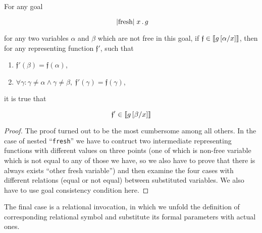 {\color{blue}
\begin{lemma}
\label{ChangeFreeVarLemma}
For any goal 

\[
\mbox{\lstinline|fresh|}\;x\,.\,g
\]

for any two variables $\alpha$ and $\beta$ which are not free in this goal,
if $\mathfrak{f} \in \llbracket{g\,[\alpha/x]}\rrbracket$, then for any representing function $\mathfrak{f}'$, such that

\begin{enumerate}
\item $\mathfrak{f}'(\beta) = \mathfrak{f}(\alpha)$,
\item $\forall \gamma: \gamma \neq \alpha \land \gamma \neq \beta,\; \mathfrak{f}'(\gamma) = \mathfrak{f}(\gamma)$,
\end{enumerate}

it is true that

\[
\mathfrak{f}' \in \llbracket{g\,[\beta/x]}\rrbracket
\]
\end{lemma}
\begin{proof}
  The proof turned out to be the most cumbersome among all others. In the case of nested ``\lstinline|fresh|'' we have to contruct two
  intermediate representing functions with different values on three points (one of which is non-free variable which is not equal to
  any of those we have, so we also have to prove that there is always exists ``other fresh variable'') and then examine the four cases
  with different relations (equal or not equal) between substituted variables. We also have to use goal consistency condition here.
\end{proof}
}

\begin{comment} We introduce some nondeterminism by choosing arbitrary $\alpha$, but we have proven by
structural induction that with different choices of free variable the semantics of a goal does not change (and this proof turned out to
be the most cumbersome among all others). 
\end{comment}

The final case is a relational invocation, in which we unfold the definition of corresponding
relational symbol and substitute its formal parameters with actual ones.


